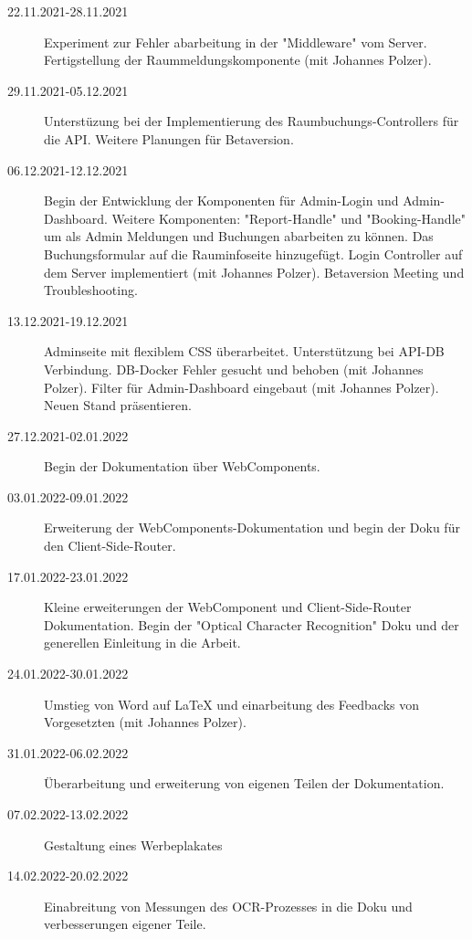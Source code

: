 \begin{description}
    \item[22.11.2021-28.11.2021] Experiment zur Fehler abarbeitung in der "Middleware" vom Server. Fertigstellung der Raummeldungskomponente (mit Johannes Polzer).
    \item[29.11.2021-05.12.2021] Unterstüzung bei der Implementierung des Raumbuchungs-Controllers für die API. Weitere Planungen für Betaversion.
    \item[06.12.2021-12.12.2021] Begin der Entwicklung der Komponenten für Admin-Login und Admin-Dashboard. Weitere Komponenten: "Report-Handle" und "Booking-Handle" um als Admin Meldungen und Buchungen abarbeiten zu können. Das Buchungsformular auf die Rauminfoseite hinzugefügt. Login Controller auf dem Server implementiert (mit Johannes Polzer). Betaversion Meeting und Troubleshooting.
    \item[13.12.2021-19.12.2021] Adminseite mit flexiblem CSS überarbeitet. Unterstützung bei API-DB Verbindung. DB-Docker Fehler gesucht und behoben (mit Johannes Polzer). Filter für Admin-Dashboard eingebaut (mit Johannes Polzer). Neuen Stand präsentieren.
    \item[27.12.2021-02.01.2022] Begin der Dokumentation über WebComponents.
    \item[03.01.2022-09.01.2022] Erweiterung der WebComponents-Dokumentation und begin der Doku für den Client-Side-Router.
    \item[17.01.2022-23.01.2022] Kleine erweiterungen der WebComponent und Client-Side-Router Dokumentation. Begin der "Optical Character Recognition" Doku und der generellen Einleitung in die Arbeit. 
    \item[24.01.2022-30.01.2022] Umstieg von Word auf LaTeX und einarbeitung des Feedbacks von Vorgesetzten (mit Johannes Polzer). 
    \item[31.01.2022-06.02.2022] Überarbeitung und erweiterung von eigenen Teilen der Dokumentation. 
    \item[07.02.2022-13.02.2022] Gestaltung eines Werbeplakates
    \item[14.02.2022-20.02.2022] Einabreitung von Messungen des OCR-Prozesses in die Doku und verbesserungen eigener Teile.
\end{description}